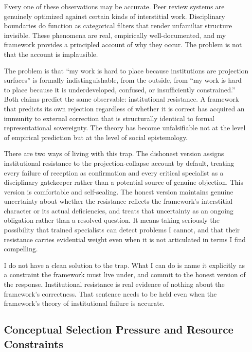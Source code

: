 \documentclass[12pt, a4paper]{article}
\begin{document}
Every one of these observations may be accurate. Peer review systems are genuinely optimized against certain kinds of interstitial work. Disciplinary boundaries do function as categorical filters that render unfamiliar structure invisible. These phenomena are real, empirically well-documented, and my framework provides a principled account of why they occur. The problem is not that the account is implausible.

The problem is that \enquote{my work is hard to place because institutions are projection surfaces} is formally indistinguishable, from the outside, from \enquote{my work is hard to place because it is underdeveloped, confused, or insufficiently constrained.} Both claims predict the same observable: institutional resistance. A framework that predicts its own rejection regardless of whether it is correct has acquired an immunity to external correction that is structurally identical to formal representational sovereignty. The theory has become unfalsifiable not at the level of empirical prediction but at the level of social epistemology.

There are two ways of living with this trap. The dishonest version assigns institutional resistance to the projection-collapse account by default, treating every failure of reception as confirmation and every critical specialist as a disciplinary gatekeeper rather than a potential source of genuine objection. This version is comfortable and self-sealing. The honest version maintains genuine uncertainty about whether the resistance reflects the framework's interstitial character or its actual deficiencies, and treats that uncertainty as an ongoing obligation rather than a resolved question. It means taking seriously the possibility that trained specialists can detect problems I cannot, and that their resistance carries evidential weight even when it is not articulated in terms I find compelling.

I do not have a clean solution to the trap. What I can do is name it explicitly as a constraint the framework must live under, and commit to the honest version of the response. Institutional resistance is real evidence of nothing about the framework's correctness. That sentence needs to be held even when the framework's theory of institutional failure is accurate.

\subsection*{Conceptual Selection Pressure and Resource Constraints}
\end{document}

